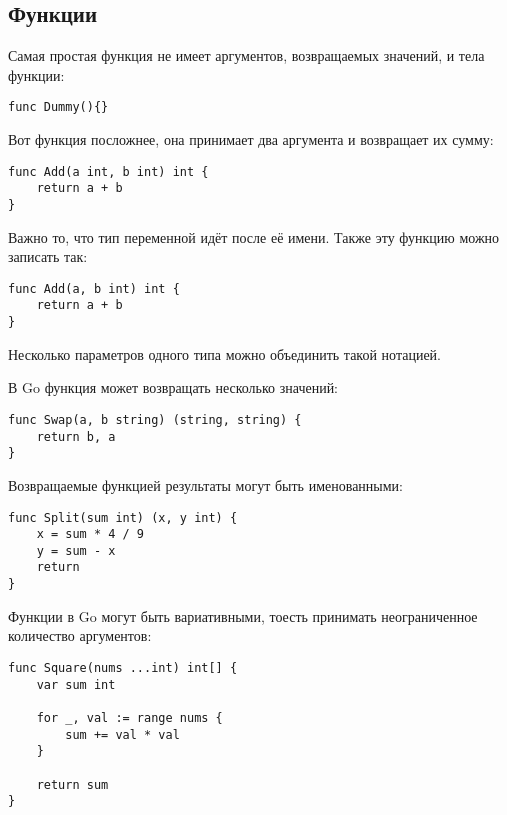 \subsection{Функции}
Самая простая функция не имеет аргументов, возвращаемых значений, и тела функции:
\begin{verbatim}
func Dummy(){}
\end{verbatim}

\noindent Вот функция посложнее, она принимает два аргумента и возвращает их сумму:
\begin{verbatim}
func Add(a int, b int) int {
    return a + b
}
\end{verbatim}
Важно то, что тип переменной идёт после её имени. Также эту функцию можно записать так:
\begin{verbatim}
func Add(a, b int) int {
    return a + b
}
\end{verbatim}
Несколько параметров одного типа можно объединить такой нотацией.

\noindent В Go функция может возвращать несколько значений:
\begin{verbatim}
func Swap(a, b string) (string, string) {
    return b, a
}
\end{verbatim}

\noindent Возвращаемые функцией результаты могут быть именованными:
\begin{verbatim}
func Split(sum int) (x, y int) {
    x = sum * 4 / 9
    y = sum - x
    return
}
\end{verbatim}

\noindent Функции в Go могут быть вариативными, тоесть принимать неограниченное количество аргументов:
\begin{verbatim}
func Square(nums ...int) int[] {
    var sum int

    for _, val := range nums {
        sum += val * val
    }

    return sum
}
\end{verbatim}
